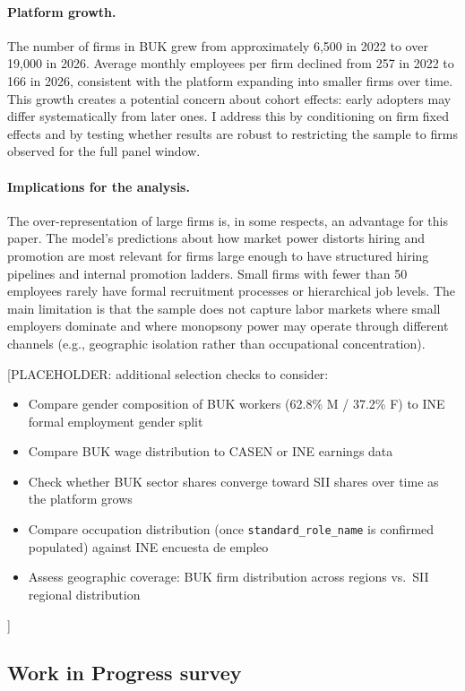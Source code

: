 \documentclass[11pt]{article}
\begin{document}
\paragraph{Platform growth.} The number of firms in BUK grew from approximately 6,500 in 2022 to over 19,000 in 2026. Average monthly employees per firm declined from 257 in 2022 to 166 in 2026, consistent with the platform expanding into smaller firms over time. This growth creates a potential concern about cohort effects: early adopters may differ systematically from later ones. I address this by conditioning on firm fixed effects and by testing whether results are robust to restricting the sample to firms observed for the full panel window.

\paragraph{Implications for the analysis.} The over-representation of large firms is, in some respects, an advantage for this paper. The model's predictions about how market power distorts hiring and promotion are most relevant for firms large enough to have structured hiring pipelines and internal promotion ladders. Small firms with fewer than 50 employees rarely have formal recruitment processes or hierarchical job levels. The main limitation is that the sample does not capture labor markets where small employers dominate and where monopsony power may operate through different channels (e.g., geographic isolation rather than occupational concentration).

[PLACEHOLDER: additional selection checks to consider:
\begin{itemize}
\item Compare gender composition of BUK workers (62.8\% M / 37.2\% F) to INE formal employment gender split
\item Compare BUK wage distribution to CASEN or INE earnings data
\item Check whether BUK sector shares converge toward SII shares over time as the platform grows
\item Compare occupation distribution (once \texttt{standard\_role\_name} is confirmed populated) against INE encuesta de empleo
\item Assess geographic coverage: BUK firm distribution across regions vs.\ SII regional distribution
\end{itemize}]

\subsection{Work in Progress survey}
\end{document}

